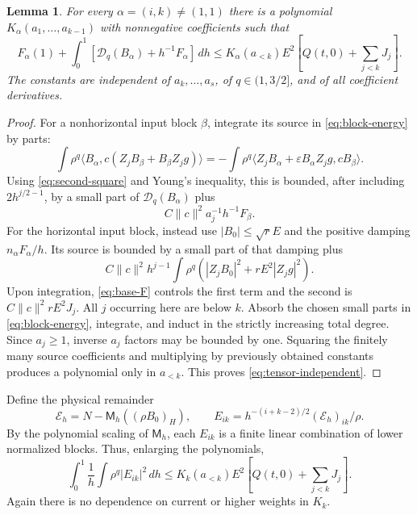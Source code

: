 \documentclass[11pt,a4paper]{amsart}
\numberwithin{equation}{section}
\newtheorem{lemma}[theorem]{Lemma}
\theoremstyle{remark}\newtheorem{remark}[theorem]{Remark}
\newcommand{\eps}{\varepsilon}
\newcommand{\cD}{\mathcal D}
\newcommand{\cE}{\mathcal E}
\newcommand{\Mom}{\mathsf M}
\newcommand{\ip}[2]{\langle #1,#2\rangle}
\newcommand{\norm}[1]{\lVert #1\rVert}
\newcommand{\dd}{\,d}
\begin{document}
\begin{lemma}\label{lem:tensor-energy}
For every $\alpha=(i,k)\ne(1,1)$ there is a polynomial
$K_\alpha(a_1,\ldots,a_{k-1})$ with nonnegative coefficients such that
\begin{equation}\label{eq:tensor-independent}
 F_\alpha(1)+\int_0^1\left[\cD_q(B_\alpha)+h^{-1}F_\alpha\right]\dd h
 \le K_\alpha(a_{<k})E^2\left[Q(t,0)+\sum_{j<k}J_j\right].
\end{equation}
The constants are independent of $a_k,\ldots,a_s$, of $q\in(1,3/2]$, and
of all coefficient derivatives.
\end{lemma}

\begin{proof}
For a nonhorizontal input block $\beta$, integrate its source in
\eqref{eq:block-energy} by parts:
\begin{equation}\label{eq:key-ibp}
 \int\rho^q\ip{B_\alpha}{c(Z_jB_\beta+B_\beta Z_jg)}
 =-\int\rho^q\ip{Z_jB_\alpha+\eps B_\alpha Z_jg}{cB_\beta}.
\end{equation}
Using \eqref{eq:second-square} and Young's inequality, this is bounded, after
including $2h^{j/2-1}$, by a small part of $\cD_q(B_\alpha)$ plus
\[
 C\norm c^2 a_j^{-1}h^{-1}F_\beta.
\]
For the horizontal input block, instead use $|B_0|\le\sqrt r E$ and the
positive damping $n_\alpha F_\alpha/h$. Its source is bounded by a small
part of that damping plus
\[
 C\norm c^2h^{j-1}\int\rho^q
          (|Z_jB_0|^2+rE^2|Z_jg|^2).
\]
Upon integration, \eqref{eq:base-F} controls the first term and the second is
$C\norm c^2rE^2J_j$. All $j$ occurring here are below $k$. Absorb the chosen
small parts in \eqref{eq:block-energy}, integrate, and induct in the strictly
increasing total degree. Since $a_j\ge1$, inverse $a_j$ factors may be
bounded by one. Squaring the finitely many source coefficients and multiplying
by previously obtained constants produces a polynomial only in $a_{<k}$.
This proves \eqref{eq:tensor-independent}.
\end{proof}

Define the physical remainder
\begin{equation}\label{eq:remainder}
 \cE_h=N-\Mom_h((\rho B_0)_H),\qquad
 E_{ik}=h^{-(i+k-2)/2}(\cE_h)_{ik}/\rho.
\end{equation}
By the polynomial scaling of $\Mom_h$, each $E_{ik}$ is a finite linear
combination of lower normalized blocks. Thus, enlarging the polynomials,
\begin{equation}\label{eq:remainder-energy}
 \int_0^1\frac1h\int\rho^q|E_{ik}|^2\dd h
 \le K_k(a_{<k})E^2\left[Q(t,0)+\sum_{j<k}J_j\right].
\end{equation}
Again there is no dependence on current or higher weights in $K_k$.
\end{document}
